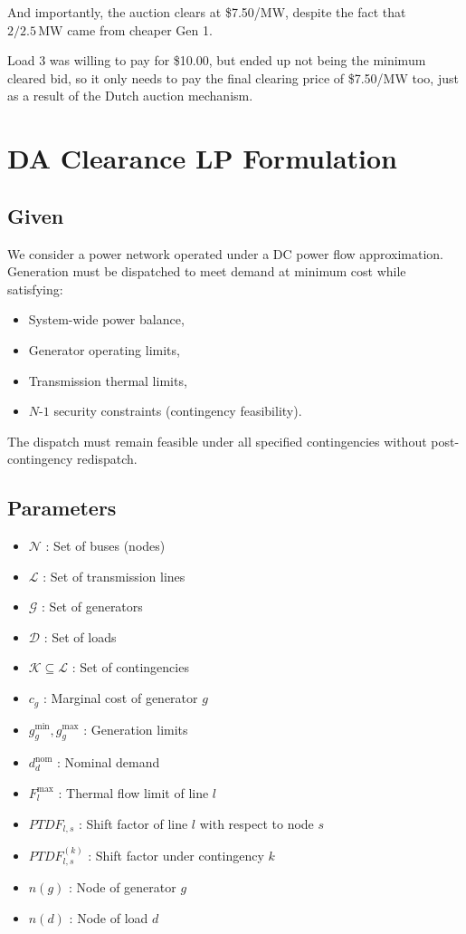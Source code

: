 \documentclass[11pt]{article}
\begin{document}
And importantly, the auction clears at \$7.50/MW, despite the fact that $2/2.5\,\mathrm{MW}$ came from cheaper Gen 1.

Load 3 was willing to pay for \$10.00, but ended up not being the minimum cleared bid, so it only needs to pay the final clearing price of \$7.50/MW too, just as a result of the Dutch auction mechanism.

\newpage

\section{DA Clearance LP Formulation}

\subsection{Given}

We consider a power network operated under a DC power flow approximation.
Generation must be dispatched to meet demand at minimum cost while satisfying:

\begin{itemize}
    \item System-wide power balance,
    \item Generator operating limits,
    \item Transmission thermal limits,
    \item $N$-$1$ security constraints (contingency feasibility).
\end{itemize}

The dispatch must remain feasible under all specified contingencies without post-contingency redispatch.

\subsection{Parameters}

\begin{itemize}
    \item $\mathcal{N}$ : Set of buses (nodes)
    \item $\mathcal{L}$ : Set of transmission lines
    \item $\mathcal{G}$ : Set of generators
    \item $\mathcal{D}$ : Set of loads
    \item $\mathcal{K} \subseteq \mathcal{L}$ : Set of contingencies
    \item $c_g$ : Marginal cost of generator $g$
    \item $g_g^{\min}, g_g^{\max}$ : Generation limits
    \item $d_d^{\text{nom}}$ : Nominal demand
    \item $F_l^{\max}$ : Thermal flow limit of line $l$
    \item $PTDF_{l,s}$ : Shift factor of line $l$ with respect to node $s$
    \item $PTDF_{l,s}^{(k)}$ : Shift factor under contingency $k$
    \item $n(g)$ : Node of generator $g$
    \item $n(d)$ : Node of load $d$
\end{itemize}
\end{document}
